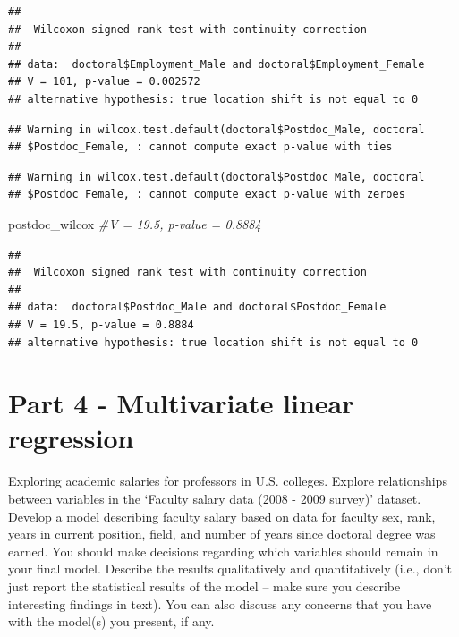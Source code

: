 \documentclass[]{article}
\newenvironment{Shaded}{\begin{snugshade}}{\end{snugshade}}
\newcommand{\KeywordTok}[1]{\textcolor[rgb]{0.13,0.29,0.53}{\textbf{#1}}}
\newcommand{\DataTypeTok}[1]{\textcolor[rgb]{0.13,0.29,0.53}{#1}}
\newcommand{\StringTok}[1]{\textcolor[rgb]{0.31,0.60,0.02}{#1}}
\newcommand{\CommentTok}[1]{\textcolor[rgb]{0.56,0.35,0.01}{\textit{#1}}}
\newcommand{\OtherTok}[1]{\textcolor[rgb]{0.56,0.35,0.01}{#1}}
\newcommand{\OperatorTok}[1]{\textcolor[rgb]{0.81,0.36,0.00}{\textbf{#1}}}
\newcommand{\NormalTok}[1]{#1}
\begin{document}
\begin{verbatim}
## 
##  Wilcoxon signed rank test with continuity correction
## 
## data:  doctoral$Employment_Male and doctoral$Employment_Female
## V = 101, p-value = 0.002572
## alternative hypothesis: true location shift is not equal to 0
\end{verbatim}

\begin{Shaded}
\end{Shaded}

\begin{verbatim}
## Warning in wilcox.test.default(doctoral$Postdoc_Male, doctoral
## $Postdoc_Female, : cannot compute exact p-value with ties
\end{verbatim}

\begin{verbatim}
## Warning in wilcox.test.default(doctoral$Postdoc_Male, doctoral
## $Postdoc_Female, : cannot compute exact p-value with zeroes
\end{verbatim}

\begin{Shaded}
\begin{Highlighting}[]
\NormalTok{postdoc_wilcox }\CommentTok{#V = 19.5, p-value = 0.8884}
\end{Highlighting}
\end{Shaded}

\begin{verbatim}
## 
##  Wilcoxon signed rank test with continuity correction
## 
## data:  doctoral$Postdoc_Male and doctoral$Postdoc_Female
## V = 19.5, p-value = 0.8884
## alternative hypothesis: true location shift is not equal to 0
\end{verbatim}

\section{Part 4 - Multivariate linear
regression}\label{part-4---multivariate-linear-regression}

Exploring academic salaries for professors in U.S. colleges. Explore
relationships between variables in the `Faculty salary data (2008 - 2009
survey)' dataset. Develop a model describing faculty salary based on
data for faculty sex, rank, years in current position, field, and number
of years since doctoral degree was earned. You should make decisions
regarding which variables should remain in your final model. Describe
the results qualitatively and quantitatively (i.e., don't just report
the statistical results of the model -- make sure you describe
interesting findings in text). You can also discuss any concerns that
you have with the model(s) you present, if any.
\end{document}
